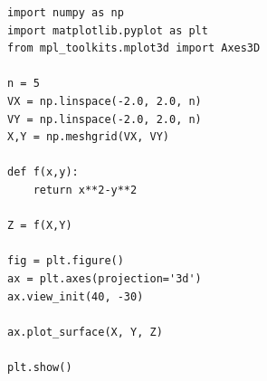 \documentclass[11pt,class=report,crop=false]{standalone}
\begin{document}
\begin{minipage}{0.53\textwidth}
\begin{lstlisting}   
import numpy as np
import matplotlib.pyplot as plt
from mpl_toolkits.mplot3d import Axes3D

n = 5
VX = np.linspace(-2.0, 2.0, n)
VY = np.linspace(-2.0, 2.0, n)
X,Y = np.meshgrid(VX, VY)

def f(x,y):
	return x**2-y**2

Z = f(X,Y)

fig = plt.figure()
ax = plt.axes(projection='3d')
ax.view_init(40, -30)

ax.plot_surface(X, Y, Z)
 
plt.show()

\end{lstlisting}
\end{minipage}
\end{document}
